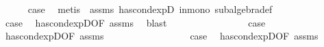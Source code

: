 \begin{isabellebody}
\ \ \ \ \isamarkupfalse%
\ {\isacharquery}{\kern0pt}case\ \isamarkupfalse%
\ {\isacharparenleft}{\kern0pt}metis\ {}\ assms{\isacharparenleft}{\kern0pt}{}{\isacharcomma}{\kern0pt}{}{\isacharcomma}{\kern0pt}{}{\isacharparenright}{\kern0pt}\ has{\isacharunderscore}{\kern0pt}cond{\isacharunderscore}{\kern0pt}expD{\isacharparenleft}{\kern0pt}{}{\isacharparenright}{\kern0pt}\ in{\isacharunderscore}{\kern0pt}mono\ subalgebra{\isacharunderscore}{\kern0pt}def{\isacharparenright}{\kern0pt}\isanewline
\ \ \isamarkupfalse%
\isanewline
\ \ \ \ \isamarkupfalse%
\ {}\isanewline
\ \ \ \ \isamarkupfalse%
\ \isamarkupfalse%
\ {\isacharquery}{\kern0pt}case\ \isamarkupfalse%
\ has{\isacharunderscore}{\kern0pt}cond{\isacharunderscore}{\kern0pt}expD{\isacharparenleft}{\kern0pt}{}{\isacharparenright}{\kern0pt}{\isacharbrackleft}{\kern0pt}OF\ assms{\isacharparenleft}{\kern0pt}{}{\isacharparenright}{\kern0pt}{\isacharbrackright}{\kern0pt}\ \isamarkupfalse%
\ blast\isanewline
\ \ \isamarkupfalse%
\isanewline
\ \ \ \ \isamarkupfalse%
\ {}\isanewline
\ \ \ \ \isamarkupfalse%
\ \isamarkupfalse%
\ {\isacharquery}{\kern0pt}case\ \isamarkupfalse%
\ has{\isacharunderscore}{\kern0pt}cond{\isacharunderscore}{\kern0pt}expD{\isacharparenleft}{\kern0pt}{}{\isacharparenright}{\kern0pt}{\isacharbrackleft}{\kern0pt}OF\ assms{\isacharparenleft}{\kern0pt}{}{\isacharparenright}{\kern0pt}{\isacharbrackright}{\kern0pt}\ \isacommand{{\isachardot}{\kern0pt}}\isamarkupfalse%
\isanewline
\ \ \isamarkupfalse%
\isanewline
\ \ \ \ \isamarkupfalse%
\ {}\isanewline
\ \ \ \ \isamarkupfalse%
\ \isamarkupfalse%
\ {\isacharquery}{\kern0pt}case\ \isamarkupfalse%
\ has{\isacharunderscore}{\kern0pt}cond{\isacharunderscore}{\kern0pt}expD{\isacharparenleft}{\kern0pt}{}{\isacharparenright}{\kern0pt}{\isacharbrackleft}{\kern0pt}OF\ assms{\isacharparenleft}{\kern0pt}{}{\isacharparenright}{\kern0pt}{\isacharbrackright}{\kern0pt}\ \isacommand{{\isachardot}{\kern0pt}}\isamarkupfalse%
\isanewline
\ \ \isamarkupfalse%
\isanewline
{}\isamarkupfalse%
%
\endisatagproof
{\isafoldproof}%
%
\isadelimproof
\isanewline
%
\endisadelimproof

\end{isabellebody}
